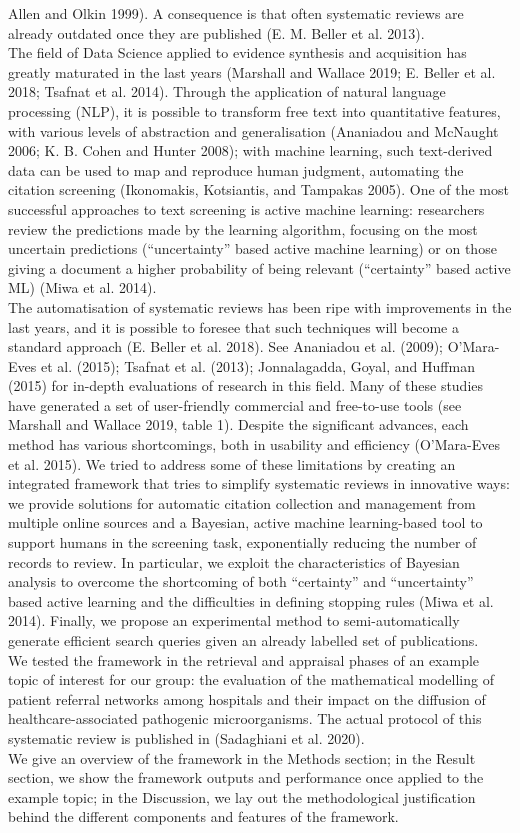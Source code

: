 \documentclass{article}
\begin{document}
Allen and Olkin 1999). A consequence is that often systematic reviews
are already outdated once they are published (E. M. Beller et al.
2013).\\
The field of Data Science applied to evidence synthesis and acquisition
has greatly maturated in the last years (Marshall and Wallace 2019; E.
Beller et al. 2018; Tsafnat et al. 2014). Through the application of
natural language processing (NLP), it is possible to transform free text
into quantitative features, with various levels of abstraction and
generalisation (Ananiadou and McNaught 2006; K. B. Cohen and Hunter
2008); with machine learning, such text-derived data can be used to map
and reproduce human judgment, automating the citation screening
(Ikonomakis, Kotsiantis, and Tampakas 2005). One of the most successful
approaches to text screening is active machine learning: researchers
review the predictions made by the learning algorithm, focusing on the
most uncertain predictions (``uncertainty'' based active machine
learning) or on those giving a document a higher probability of being
relevant (``certainty'' based active ML) (Miwa et al. 2014).\\
The automatisation of systematic reviews has been ripe with improvements
in the last years, and it is possible to foresee that such techniques
will become a standard approach (E. Beller et al. 2018). See Ananiadou
et al. (2009); O'Mara-Eves et al. (2015); Tsafnat et al. (2013);
Jonnalagadda, Goyal, and Huffman (2015) for in-depth evaluations of
research in this field. Many of these studies have generated a set of
user-friendly commercial and free-to-use tools (see Marshall and Wallace
2019, table 1). Despite the significant advances, each method has
various shortcomings, both in usability and efficiency (O'Mara-Eves et
al. 2015). We tried to address some of these limitations by creating an
integrated framework that tries to simplify systematic reviews in
innovative ways: we provide solutions for automatic citation collection
and management from multiple online sources and a Bayesian, active
machine learning-based tool to support humans in the screening task,
exponentially reducing the number of records to review. In particular,
we exploit the characteristics of Bayesian analysis to overcome the
shortcoming of both ``certainty'' and ``uncertainty'' based active
learning and the difficulties in defining stopping rules (Miwa et al.
2014). Finally, we propose an experimental method to semi-automatically
generate efficient search queries given an already labelled set of
publications.\\
We tested the framework in the retrieval and appraisal phases of an
example topic of interest for our group: the evaluation of the
mathematical modelling of patient referral networks among hospitals and
their impact on the diffusion of healthcare-associated pathogenic
microorganisms. The actual protocol of this systematic review is
published in (Sadaghiani et al. 2020).\\
We give an overview of the framework in the Methods section; in the
Result section, we show the framework outputs and performance once
applied to the example topic; in the Discussion, we lay out the
methodological justification behind the different components and
features of the framework.
\end{document}
